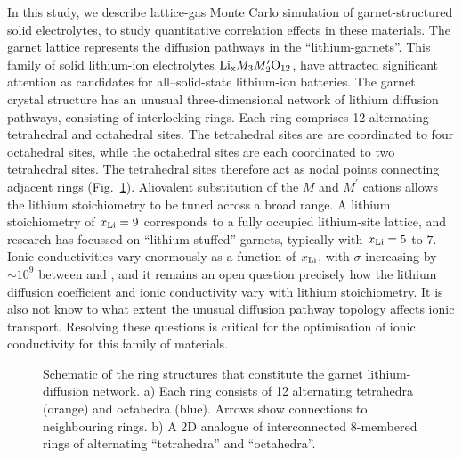\documentclass[aps,prb,twocolumn,superscriptaddress,reprint]{revtex4-1}
\newcommand{\xLi}{x_\m{Li}}
\begin{document}
In this study, we describe lattice-gas Monte Carlo simulation of  garnet-structured solid electrolytes, to study quantitative correlation effects in these materials. The garnet lattice represents the diffusion pathways in the ``lithium-garnets''. This family of solid lithium-ion electrolytes $\mathrm{Li}_{\mathrm{x}}M_3M^\prime_2\mathrm{O}_{12}$,\cite{ThangaduraiEtAl_JAmCeramSoc2003, ThangaduraiEtAl_JPhysChemLett2015} have attracted significant attention as candidates for all--solid-state lithium-ion batteries.\cite{BachmanEtAl_ChemRev2016, InadaEtAl_FrontEnergyRes2016,HanEtAl_NatMater2016, RamakumarEtAl_ProgMaterSci2017} The garnet crystal structure has an unusual three-dimensional network of lithium diffusion pathways, consisting of interlocking rings.\cite{AwakaEtAl_ChemLett2011} Each ring comprises 12 alternating tetrahedral and octahedral sites. The tetrahedral sites are are coordinated to four octahedral sites, while the octahedral sites are each coordinated to two tetrahedral sites. The tetrahedral sites therefore act as nodal points connecting adjacent rings (Fig.~\ref{fig:garnet_network_schematic}).
Aliovalent substitution of the $M$ and $M^\prime$ cations allows the lithium stoichiometry to be tuned across a broad range. 
A lithium stoichiometry of $\xLi=9$ corresponds to a fully occupied lithium-site lattice, and research has focussed on ``lithium stuffed'' garnets, typically with $\xLi=5$ to $7$. 
Ionic conductivities vary enormously as a function of $\xLi$, with $\sigma$ increasing by $\sim10^9$ between  and ,\cite{ThangaduraiEtAl_JPhysChemLett2015, BachmanEtAl_ChemRev2016} and it remains an open question precisely how the lithium diffusion coefficient and ionic conductivity vary with lithium stoichiometry. It is also not know to what extent the unusual diffusion pathway topology affects ionic transport. Resolving these questions is critical for the optimisation of ionic conductivity for this family of materials.

\begin{figure}[tb]
  \centering
    \caption{\label{fig:garnet_network_schematic}Schematic of the ring structures that constitute the garnet lithium-diffusion network. a) Each ring consists of 12 alternating tetrahedra (orange) and octahedra (blue). 
Arrows show connections to neighbouring rings.\cite{AwakaEtAl_ChemLett2011} b) A 2D analogue of interconnected 8-membered rings of alternating ``tetrahedra'' and ``octahedra''.}
\end{figure}
\end{document}
